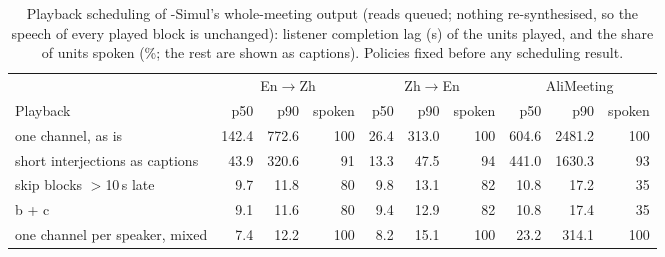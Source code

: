 \begin{table}[t]
\centering\small
\begin{tabular}{lrrrrrrrrr}
\toprule
 & \multicolumn{3}{c}{En$\rightarrow$Zh} & \multicolumn{3}{c}{Zh$\rightarrow$En} & \multicolumn{3}{c}{AliMeeting} \\
\cmidrule(lr){2-4}\cmidrule(lr){5-7}\cmidrule(lr){8-10}
Playback & p50 & p90 & spoken & p50 & p90 & spoken & p50 & p90 & spoken \\
\midrule
one channel, as is & 142.4 & 772.6 & 100 & 26.4 & 313.0 & 100 & 604.6 & 2481.2 & 100 \\
short interjections as captions & 43.9 & 320.6 & 91 & 13.3 & 47.5 & 94 & 441.0 & 1630.3 & 93 \\
skip blocks $>$10\,s late & 9.7 & 11.8 & 80 & 9.8 & 13.1 & 82 & 10.8 & 17.2 & 35 \\
b + c & 9.1 & 11.6 & 80 & 9.4 & 12.9 & 82 & 10.8 & 17.4 & 35 \\
one channel per speaker, mixed & 7.4 & 12.2 & 100 & 8.2 & 15.1 & 100 & 23.2 & 314.1 & 100 \\
\bottomrule
\end{tabular}
\caption{Playback scheduling of \sys{}-Simul's whole-meeting output (reads queued; nothing re-synthesised, so the speech
of every played block is unchanged): listener completion lag (s) of the units played, and the share of units spoken
(\%; the rest are shown as captions). Policies fixed before any scheduling result.}
\label{tab:sched8}
\end{table}
